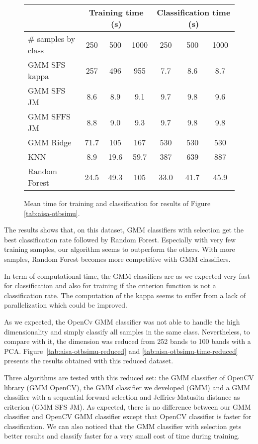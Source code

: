 \documentclass[a4paper,11pt,DIV=16,abstracton]{scrartcl}
\begin{document}
    \begin{figure}[!ht]
        \centering
        \begin{tabular}{|l|c|c|c|c|c|c|}\hline
             & \multicolumn{3}{c|}{\bfseries Training time (s)} & \multicolumn{3}{c|}{\bfseries Classification time (s)} \\ \hline
            \# samples by class & 250 & 500 & 1000 & 250 & 500 & 1000 \\ \hline

            GMM SFS kappa & 257 & 496 & 955 & 7.7 & 8.6 & 8.7 \\
            GMM SFS JM &    8.6 & 8.9 & 9.1 & 9.7 & 9.8 & 9.6 \\
            GMM SFFS JM &   8.8 & 9.0 & 9.3 & 9.7 & 9.8 & 9.8 \\
            GMM Ridge &     71.7 & 105 & 167 & 530 & 530 & 530 \\
            KNN &           8.9 & 19.6 & 59.7 & 387 & 639 & 887 \\
            Random Forest & 24.5 & 49.3 & 105 & 33.0 & 41.7 & 45.9 \\

            \hline
        \end{tabular}
        \caption{Mean time for training and classification for results of Figure \ref{tab:aisa-otbsimu}.\label{tab:aisa-otbsimu-time}}
    \end{figure}

    The results shows that, on this dataset, GMM classifiers with selection get the best classification rate followed by Random Forest. Especially with very few training samples, our algorithm seems to outperform the others. With more samples, Random Forest becomes more competitive with GMM classifiers.

    In term of computational time, the GMM classifiers are as we expected very fast for classification and also for training if the criterion function is not a classification rate. The computation of the kappa seems to suffer from a lack of parallelization which could be improved.

    As we expected, the OpenCv GMM classifier was not able to handle the high dimensionality and simply classify all samples in the same class. Nevertheless, to compare with it, the dimension was reduced from 252 bands to 100 bands with a PCA. Figure~\ref{tab:aisa-otbsimu-reduced} and \ref{tab:aisa-otbsimu-time-reduced} presents the results obtained with this reduced dataset.

    Three algorithms are tested with this reduced set: the GMM classifier of OpenCV library (GMM OpenCV), the GMM classifier we developed (GMM) and a GMM classifier with a sequential forward selection and Jeffries-Matusita distance as criterion (GMM SFS JM). As expected, there is no difference between our GMM classifier and OpenCV GMM classifier except that OpenCV classifier is faster for classification. We can also noticed that the GMM classifier with selection gets better results and classify faster for a very small cost of time during training.
\end{document}
